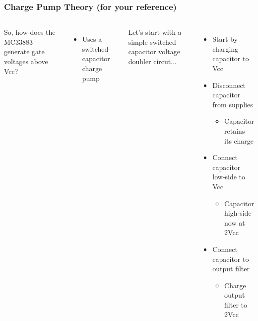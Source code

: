 \documentclass{beamer}
\begin{document}
\begin{frame}
\frametitle{Charge Pump Theory \small (for your reference)}
\begin{columns}[t]
So, how does the MC33883 generate gate voltages above Vcc?
\begin{itemize}
  \item Uses a switched-capacitor charge pump
\end{itemize} 
Let's start with a simple switched-capacitor voltage doubler circut...
\begin{itemize}
  \item Start by charging capacitor to Vcc
  \item<2-> Disconnect capacitor from supplies
  \begin{itemize}
    \item<2-> Capacitor retains its charge
  \end{itemize}
  \item<3-> Connect capacitor low-side to Vcc
  \begin{itemize}
    \item<3-> Capacitor high-side now at 2Vcc
  \end{itemize}  
  \item<4-> Connect capacitor to output filter
  \begin{itemize}
    \item<4-> Charge output filter to 2Vcc
  \end{itemize}  
\end{itemize}


\end{columns}
\end{frame}
\end{document}
